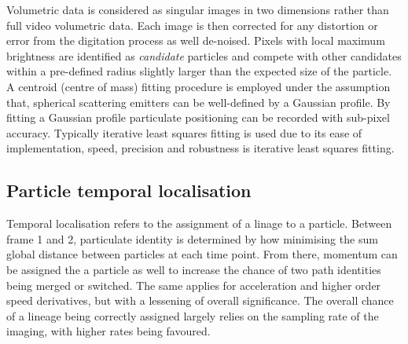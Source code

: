 Volumetric data is considered as singular images in two dimensions rather than full video volumetric data.
Each image is then corrected for any distortion or error from the digitation process as well de-noised. %
Pixels with local maximum brightness are identified as \emph{candidate} particles and compete with other candidates within a pre-defined radius slightly larger than the expected size of the particle.
A centroid (centre of mass) fitting procedure is employed under the assumption that, %
spherical scattering emitters can be well-defined by a Gaussian profile.
By fitting a Gaussian profile %
particulate positioning can be recorded with sub-pixel accuracy.
Typically iterative least squares fitting is used %
due to its ease of implementation, speed, precision and robustness is iterative least squares fitting.

%


\subsection{Particle temporal localisation}

Temporal localisation refers to the assignment of a linage to a particle.
Between frame 1 and 2, particulate identity is determined by how minimising the sum global distance between particles at each time point.
From there, momentum can be assigned the a particle as well to increase the chance of two path identities being merged or switched.
The same applies for acceleration and higher order speed derivatives, but with a lessening of overall significance.
The overall chance of a lineage being correctly assigned largely relies on the sampling rate of the imaging, with higher rates being favoured.

